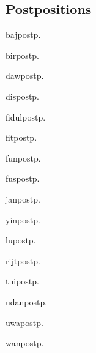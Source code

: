 \begin{multicols*}{2}
\section{Postpositions}

\begin{description}[leftmargin=*,labelwidth=*]
    \begin{dictentry}{baj}{postp.}
    \end{dictentry}
    \begin{dictentry}{bir}{postp.}
    \end{dictentry}
    \begin{dictentry}{daw}{postp.}
    \end{dictentry}
    \begin{dictentry}{dis}{postp.}
    \end{dictentry}
    \begin{dictentry}{fidul}{postp.}
    \end{dictentry}
    \begin{dictentry}{fit}{postp.}
    \end{dictentry}
    \begin{dictentry}{fun}{postp.}
    \end{dictentry}
    \begin{dictentry}{fus}{postp.}
    \end{dictentry}
    \begin{dictentry}{jan}{postp.}
    \end{dictentry}
    \begin{dictentry}{yin}{postp.}
    \end{dictentry}
    \begin{dictentry}{lu}{postp.}
    \end{dictentry}
    \begin{dictentry}{rijt}{postp.}
    \end{dictentry}
    \begin{dictentry}{tui}{postp.}
    \end{dictentry}
    \begin{dictentry}{udan}{postp.}
    \end{dictentry}
    \begin{dictentry}{uwa}{postp.}
    \end{dictentry}
    \begin{dictentry}{wan}{postp.}
    \end{dictentry}
\end{description}


\end{multicols*}
